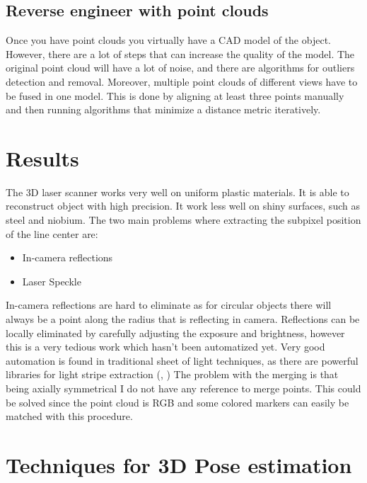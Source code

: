 \documentclass[12pt,a4paper]{article}
\begin{document}
\clearpage
\newpage

\subsection{Reverse engineer with point clouds}
Once you have point clouds you virtually have a CAD model of the object. However, there are a lot of steps that can increase the quality of the model. The original point cloud will have a lot of noise, and there are algorithms for outliers detection and removal. Moreover, multiple point clouds of different views have to be fused in one model. This is done by aligning at least three points manually and then running algorithms that minimize a distance metric iteratively.
\section{Results}
The 3D laser scanner works very well on uniform plastic materials. It is able to reconstruct object with high precision. It work less well on shiny surfaces, such as steel and niobium. 
The two main problems where extracting the subpixel position of the line center are:
\begin{itemize}
    \item In-camera reflections
    \item Laser Speckle
\end{itemize}
In-camera reflections are hard to eliminate as for circular objects there will always be a point along the radius that is reflecting in camera. Reflections can be locally eliminated by carefully adjusting the exposure and brightness, however this is a very tedious work which hasn't been automatized yet. Very good automation is found in traditional sheet of light techniques, as there are powerful libraries for light stripe extraction (\cite{he_study_2003}, \cite{hoiem_maximize_2018}) The problem with the merging is that being axially symmetrical I do not have any reference to merge points. This could be solved since the point cloud is RGB and some colored markers can easily be matched with this procedure.

\section{Techniques for 3D Pose estimation}
\end{document}
